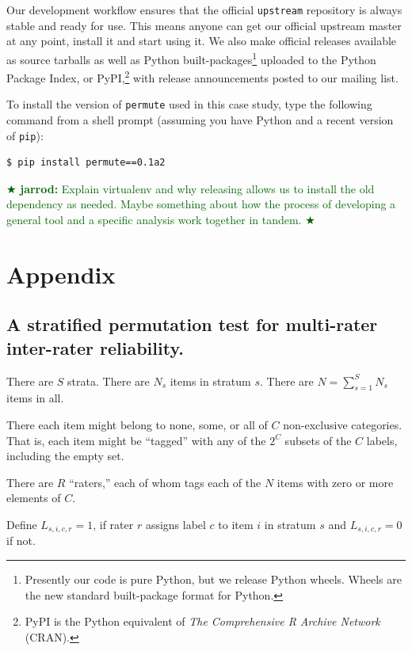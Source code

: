 \documentclass[]{article}
\newcommand{\jarrod}[1] { \textcolor{darkgreen} {
\ensuremath{\bigstar} {\bf jarrod:}  {#1}
\ensuremath{\bigstar} } }
\begin{document}
Our development workflow ensures that the official \texttt{upstream} repository
is always stable and ready for use.
This means anyone can get our official upstream master at any point, install it
and start using it.
We also make official releases available as source tarballs as well as Python
built-packages\footnote{Presently our code is pure Python, but we release
Python wheels.
Wheels are the new standard built-package format for Python.} uploaded to the
Python Package Index, or PyPI,\footnote{PyPI is the Python equivalent of \emph{The
Comprehensive R Archive Network} (CRAN).} with release announcements posted to
our mailing list.

To install the version of \texttt{permute} used in this case study, type
the following command from a shell prompt (assuming you have Python and a
recent version of \texttt{pip}):
\begin{verbatim}
$ pip install permute==0.1a2
\end{verbatim}
\jarrod{Explain virtualenv and why releasing allows us to install the
old dependency as needed.
Maybe something about how the process of developing a general tool and a
specific analysis work together in tandem.}




\pagebreak

\section*{Appendix}

\subsection*{A stratified permutation test for multi-rater inter-rater reliability.}

There are $S$ strata.
There are $N_s$ items in stratum $s$.
There are $N = \sum_{s=1}^S N_s$ items in all.

There each item might belong to none, some, or all of $C$ non-exclusive categories.
That is, each item might be ``tagged'' with any of the $2^C$ subsets
of the $C$ labels, including the empty set.

There are $R$ ``raters,'' each of whom tags each of the $N$ items with zero
or more elements of $C$.

Define $L_{s,i,c,r} = 1$, if rater $r$ assigns label $c$ to item $i$ in stratum
$s$ and $L_{s,i,c,r} = 0$ if not.
\end{document}
